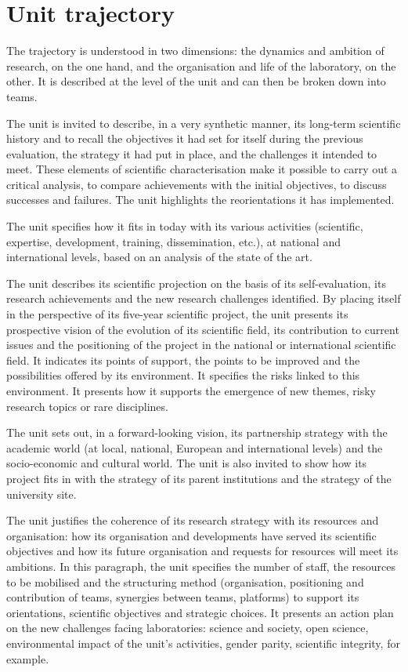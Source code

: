 \section{Unit trajectory}

\begin{hceresinstructions}
  The trajectory is understood in two dimensions: the dynamics and
  ambition of research, on the one hand, and the organisation and life of
  the laboratory, on the other. It is described at the level of the unit
  and can then be broken down into teams.

  The unit is invited to describe, in a very synthetic manner, its
  long-term scientific history and to recall the objectives it had set for
  itself during the previous evaluation, the strategy it had put in place,
  and the challenges it intended to meet. These elements of scientific
  characterisation make it possible to carry out a critical analysis, to
  compare achievements with the initial objectives, to discuss successes
  and failures. The unit highlights the reorientations it has implemented.

  The unit specifies how it fits in today with its various activities
  (scientific, expertise, development, training, dissemination, etc.), at
  national and international levels, based on an analysis of the state of
  the art.

  The unit describes its scientific projection on the basis of its
  self-evaluation, its research achievements and the new research
  challenges identified. By placing itself in the perspective of its
  five-year scientific project, the unit presents its prospective vision
  of the evolution of its scientific field, its contribution to current
  issues and the positioning of the project in the national or
  international scientific field. It indicates its points of support, the
  points to be improved and the possibilities offered by its environment.
  It specifies the risks linked to this environment. It presents how it
  supports the emergence of new themes, risky research topics or rare
  disciplines.

  The unit sets out, in a forward-looking vision, its partnership strategy
  with the academic world (at local, national, European and international
  levels) and the socio-economic and cultural world. The unit is also
  invited to show how its project fits in with the strategy of its parent
  institutions and the strategy of the university site.

  The unit justifies the coherence of its research strategy with its
  resources and organisation: how its organisation and developments have
  served its scientific objectives and how its future organisation and
  requests for resources will meet its ambitions. In this paragraph, the
  unit specifies the number of staff, the resources to be mobilised and
  the structuring method (organisation, positioning and contribution of
  teams, synergies between teams, platforms) to support its orientations,
  scientific objectives and strategic choices. It presents an action plan
  on the new challenges facing laboratories: science and society, open
  science, environmental impact of the unit's activities,
  gender parity, scientific integrity, for example.
\end{hceresinstructions}
